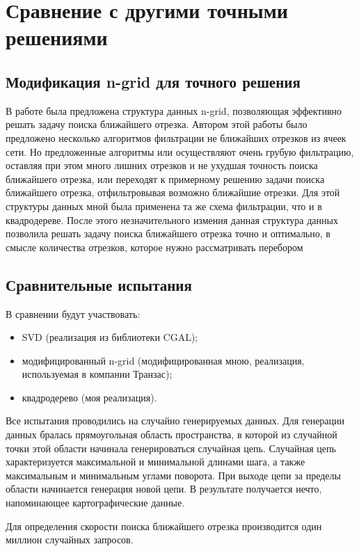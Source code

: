 \chapter{Сравнение с другими точными решениями}
\section{Модификация n-grid для точного решения}

В работе \cite{NGRID} была предложена структура данных n-grid, позволяющая
эффективно решать задачу поиска ближайшего отрезка. Автором этой работы
было предложено несколько алгоритмов фильтрации не ближайших отрезков из
ячеек сети. Но предложенные алгоритмы или осуществляют очень грубую
фильтрацию, оставляя при этом много лишних отрезков и не ухудшая точность
поиска ближайшего отрезка, или переходят к примерному решению задачи
поиска ближайшего отрезка, отфильтровывая возможно ближайшие отрезки.
Для этой структуры данных мной была применена та же схема
фильтрации, что и в квадродереве. После этого незначительного измения
данная структура данных позволила решать задачу поиска ближайшего отрезка
точно и оптимально, в смысле количества отрезков, которое нужно
рассматривать перебором

\section{Сравнительные испытания}

В сравнении будут участвовать:
\begin{itemize}
\item SVD (реализация из библиотеки CGAL);
\item модифицированный n-grid (модифицированная мною, реализация, используемая в компании
Транзас);
\item квадродерево (моя реализация).
\end{itemize}
Все испытания проводились на случайно генерируемых данных. Для
генерации данных бралась прямоугольная область пространства, в которой из
случайной точки этой области начинала генерироваться случайная цепь.
Случайная цепь характеризуется максимальной и минимальной длинами шага,
а также максимальным и минимальным углами поворота. При выходе цепи за
пределы области начинается генерация новой цепи. В результате получается
нечто, напоминающее картографические данные.

Для определения скорости поиска ближайшего отрезка производится один
миллион случайных запросов.

